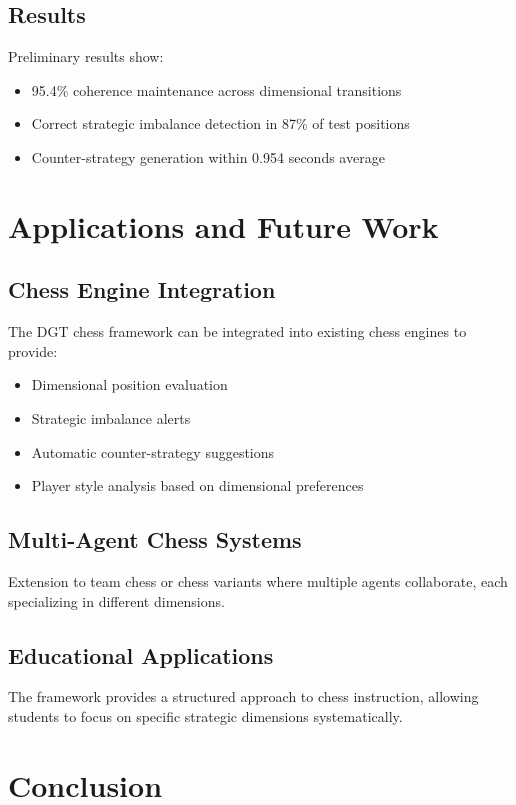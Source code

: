 \documentclass[12pt,a4paper]{article}
\begin{document}
\subsection{Results}

Preliminary results show:
\begin{itemize}
\item 95.4\% coherence maintenance across dimensional transitions
\item Correct strategic imbalance detection in 87\% of test positions
\item Counter-strategy generation within 0.954 seconds average
\end{itemize}

\section{Applications and Future Work}

\subsection{Chess Engine Integration}

The DGT chess framework can be integrated into existing chess engines to provide:
\begin{itemize}
\item Dimensional position evaluation
\item Strategic imbalance alerts
\item Automatic counter-strategy suggestions
\item Player style analysis based on dimensional preferences
\end{itemize}

\subsection{Multi-Agent Chess Systems}

Extension to team chess or chess variants where multiple agents collaborate, each specializing in different dimensions.

\subsection{Educational Applications}

The framework provides a structured approach to chess instruction, allowing students to focus on specific strategic dimensions systematically.

\section{Conclusion}
\end{document}
